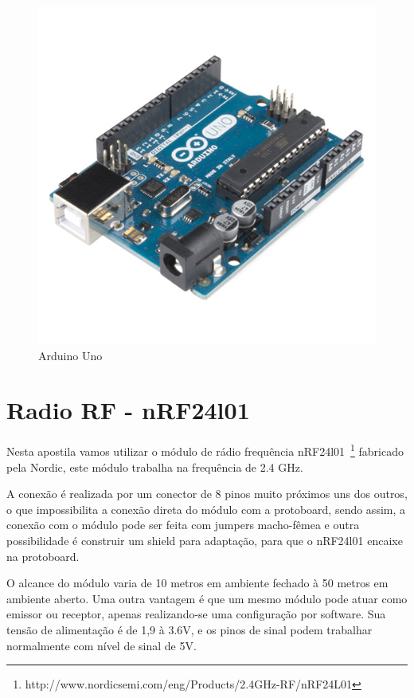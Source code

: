 \begin{figure}[ht]
      \centering
      \includegraphics[scale=0.35]{figuras/arduino.jpg}
      \caption{Arduino Uno}
      \label{fig:arduino}
\end{figure}



\section{Radio RF - nRF24l01}

Nesta apostila vamos utilizar o módulo de rádio frequência nRF24l01~\footnote{http://www.nordicsemi.com/eng/Products/2.4GHz-RF/nRF24L01} fabricado pela Nordic, este módulo trabalha na frequência de 2.4 GHz.

A conexão é realizada por um conector de 8 pinos muito próximos uns dos outros, o que impossibilita a conexão direta do módulo com a protoboard, sendo assim, a conexão com o módulo pode ser feita com jumpers macho-fêmea e outra possibilidade é construir um shield para adaptação, para que o nRF24l01 encaixe na protoboard.

O alcance do módulo varia de 10 metros em ambiente fechado à 50 metros em ambiente aberto. Uma outra vantagem é que um mesmo módulo pode atuar como emissor ou receptor, apenas realizando-se uma configuração por software. Sua tensão de alimentação é de 1,9 à 3.6V, e os pinos de sinal podem trabalhar normalmente com nível de sinal de 5V. 

